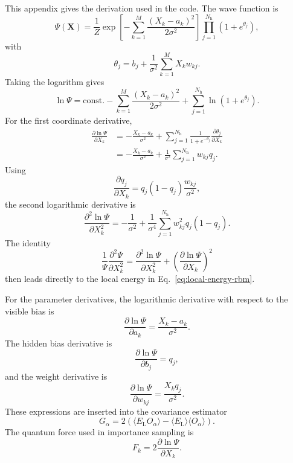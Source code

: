 \documentclass[10pt,a4paper]{article}
\newcommand{\bX}{\mathbf{X}}
\newcommand{\EL}{E_{\mathrm{L}}}
\newcommand{\Nh}{N_{\mathrm{h}}}
\begin{document}
This appendix gives the derivation used in the code. The wave function is
\begin{equation}
\Psi(\bX)=\frac{1}{Z}
\exp\left[-\sum_{k=1}^{M}\frac{(X_k-a_k)^2}{2\sigma^2}\right]
\prod_{j=1}^{\Nh}\left(1+e^{\theta_j}\right),
\end{equation}
with
\begin{equation}
\theta_j=b_j+\frac{1}{\sigma^2}\sum_{k=1}^{M}X_kw_{kj}.
\end{equation}
Taking the logarithm gives
\begin{equation}
\ln\Psi=\mathrm{const.}-\sum_{k=1}^{M}\frac{(X_k-a_k)^2}{2\sigma^2}
+\sum_{j=1}^{\Nh}\ln(1+e^{\theta_j}).
\end{equation}
For the first coordinate derivative,
\begin{align}
\frac{\partial\ln\Psi}{\partial X_k}
&=-\frac{X_k-a_k}{\sigma^2}
+\sum_{j=1}^{\Nh}\frac{1}{1+e^{-\theta_j}}\frac{\partial\theta_j}{\partial X_k}\\
&=-\frac{X_k-a_k}{\sigma^2}
+\frac{1}{\sigma^2}\sum_{j=1}^{\Nh}w_{kj}q_j.
\end{align}
Using
\begin{equation}
\frac{\partial q_j}{\partial X_k}=q_j(1-q_j)\frac{w_{kj}}{\sigma^2},
\end{equation}
the second logarithmic derivative is
\begin{equation}
\frac{\partial^2\ln\Psi}{\partial X_k^2}
=-\frac{1}{\sigma^2}
+\frac{1}{\sigma^4}\sum_{j=1}^{\Nh}w_{kj}^2q_j(1-q_j).
\end{equation}
The identity
\begin{equation}
\frac{1}{\Psi}\frac{\partial^2\Psi}{\partial X_k^2}
=
\frac{\partial^2\ln\Psi}{\partial X_k^2}
+
\left(\frac{\partial\ln\Psi}{\partial X_k}\right)^2
\end{equation}
then leads directly to the local energy in Eq.~\eqref{eq:local-energy-rbm}.

For the parameter derivatives, the logarithmic derivative with respect to the visible bias is
\begin{equation}
\frac{\partial\ln\Psi}{\partial a_k}=\frac{X_k-a_k}{\sigma^2}.
\end{equation}
The hidden bias derivative is
\begin{equation}
\frac{\partial\ln\Psi}{\partial b_j}=q_j,
\end{equation}
and the weight derivative is
\begin{equation}
\frac{\partial\ln\Psi}{\partial w_{kj}}=\frac{X_kq_j}{\sigma^2}.
\end{equation}
These expressions are inserted into the covariance estimator
\begin{equation}
G_{\alpha}=2\left(\langle\EL O_{\alpha}\rangle-\langle\EL\rangle\langle O_{\alpha}\rangle\right).
\end{equation}
The quantum force used in importance sampling is
\begin{equation}
F_k=2\frac{\partial\ln\Psi}{\partial X_k}.
\end{equation}
\end{document}
